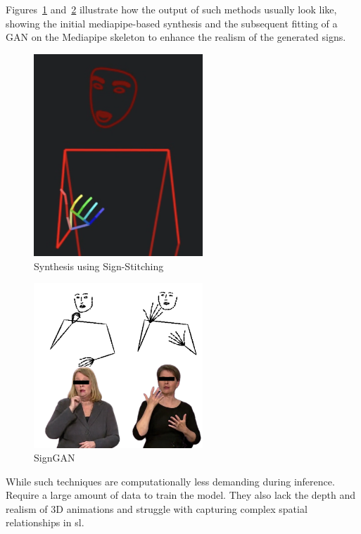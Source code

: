 \documentclass[../../main.tex]{subfiles}
\begin{document}
Figures~\ref{fig:synthesis_mediaipe_2d} and~\ref{fig:synthesis_gan_2d} illustrate how the output of such methods usually look like, showing the initial mediapipe-based synthesis and the subsequent fitting of a GAN on the Mediapipe skeleton to enhance the realism of the generated signs.

\begin{figure}
  \centering \includegraphics[width = 2.5in]{chapters/background_work/images/sign_writing_synthesis.png} 
  \caption{Synthesis using Sign-Stitching} 
  \label{fig:synthesis_mediaipe_2d} 
\end{figure}

\begin{figure} 
  \centering \includegraphics[width = 2.5in]{chapters/background_work/images/gan_synthesis.png} 
  \caption{SignGAN~\cite{saunders2020everybodysignnowtranslating}} 
  \label{fig:synthesis_gan_2d} 
\end{figure}

While such techniques are computationally less demanding during inference. Require a large amount of data to train the model. They also lack the depth and realism of 3D animations and struggle with capturing complex spatial relationships in \gls{sl}.
\end{document}
